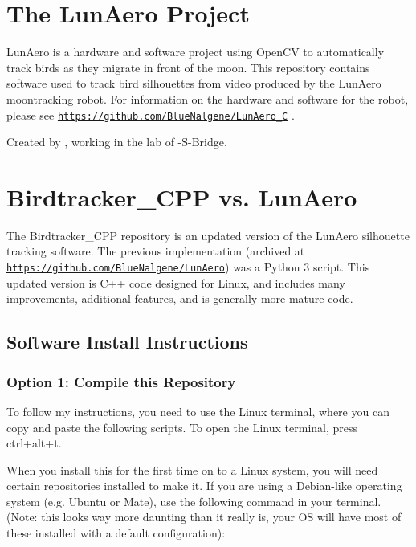 

\section*{The Lun\+Aero Project}

Lun\+Aero is a hardware and software project using Open\+CV to automatically track birds as they migrate in front of the moon. This repository contains software used to track bird silhouettes from video produced by the Lun\+Aero moontracking robot. For information on the hardware and software for the robot, please see \href{https://github.com/BlueNalgene/LunAero_C}{\tt https\+://github.\+com/\+Blue\+Nalgene/\+Lun\+Aero\+\_\+C} .

Created by , working in the lab of -\/\+S-\/\+Bridge.

\section*{Birdtracker\+\_\+\+C\+PP vs. Lun\+Aero}

The Birdtracker\+\_\+\+C\+PP repository is an updated version of the Lun\+Aero silhouette tracking software. The previous implementation (archived at \href{https://github.com/BlueNalgene/LunAero}{\tt https\+://github.\+com/\+Blue\+Nalgene/\+Lun\+Aero}) was a Python 3 script. This updated version is C++ code designed for Linux, and includes many improvements, additional features, and is generally more mature code.

\subsection*{Software Install Instructions}

\subsubsection*{Option 1\+: Compile this Repository}

To follow my instructions, you need to use the Linux terminal, where you can copy and paste the following scripts. To open the Linux terminal, press {\ttfamily ctrl}+{\ttfamily alt}+{\ttfamily t}.

When you install this for the first time on to a Linux system, you will need certain repositories installed to make it. If you are using a Debian-\/like operating system (e.\+g. Ubuntu or Mate), use the following command in your terminal. (Note\+: this looks way more daunting than it really is, your OS will have most of these installed with a default configuration)\+:


